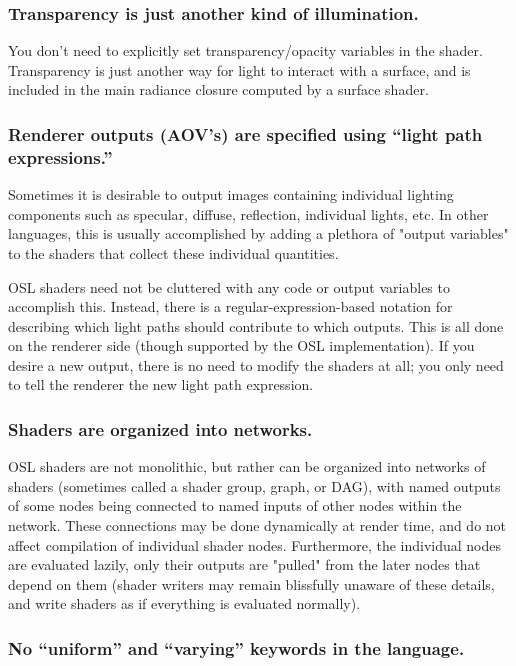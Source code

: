 \documentclass[11pt,letterpaper]{book}
\begin{document}
\subsubsection*{Transparency is just another kind of illumination.}

  You don't need to explicitly set transparency/opacity variables in the
  shader.  Transparency is just another way for light to interact with a
  surface, and is included in the main radiance closure computed by a
  surface shader.

\subsubsection*{Renderer outputs (AOV's) are specified using ``light path expressions.''}

  Sometimes it is desirable to output images containing individual
  lighting components such as specular, diffuse, reflection, individual
  lights, etc.  In other languages, this is usually accomplished by
  adding a plethora of "output variables" to the shaders that collect
  these individual quantities.

  OSL shaders need not be cluttered with any code or output variables to
  accomplish this.  Instead, there is a regular-expression-based
  notation for describing which light paths should contribute to which
  outputs.  This is all done on the renderer side (though supported by
  the OSL implementation).  If you desire a new output, there is no need
  to modify the shaders at all; you only need to tell the renderer the
  new light path expression.

\subsubsection*{Shaders are organized into networks.}

  OSL shaders are not monolithic, but rather can be organized into
  networks of shaders (sometimes called a shader group, graph, or DAG),
  with named outputs of some nodes being connected to named inputs of
  other nodes within the network.  These connections may be done
  dynamically at render time, and do not affect compilation of
  individual shader nodes.  Furthermore, the individual nodes are
  evaluated lazily, only their outputs are "pulled" from the later nodes
  that depend on them (shader writers may remain blissfully unaware of
  these details, and write shaders as if everything is evaluated
  normally).

\subsubsection*{No ``uniform'' and ``varying'' keywords in the language.}
\end{document}
